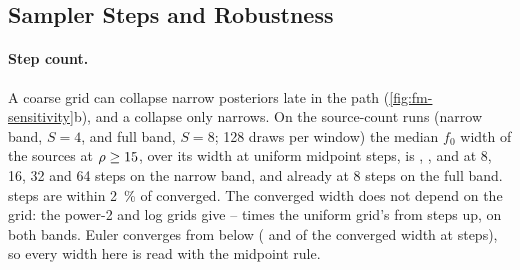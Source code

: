 \subsection{Sampler Steps and Robustness}
\label{app:evaluation-sampler}

\paragraph{Step count.}
A coarse grid can collapse narrow posteriors late in the path (\cref{fig:fm-sensitivity}b), and a collapse only narrows.
On the source-count runs (narrow band, $S=4$, and full band, $S=8$; 128 draws per window) the median $f_0$ width of the
sources at $\rho\ge15$, over its width at \ResultsSamplerNarrowMax{} uniform midpoint steps, is
\ResultsSamplerNarrowEight, \ResultsSamplerNarrowSixteen, \ResultsSamplerNarrowThirtyTwo{} and
\ResultsSamplerNarrowSixtyFour{} at 8, 16, 32 and 64 steps on the narrow band, and \ResultsSamplerFullEight{} already at 8
steps on the full band. \EvaluationOdeSteps{} steps are within \qty{2}{\percent} of converged. The converged width does not
depend on the grid: the power-2 and log grids give \ResultsSamplerGridLo--\ResultsSamplerGridHi{} times the uniform
grid's from \ResultsSamplerGridFrom{} steps up, on both bands. Euler converges from below
(\ResultsSamplerEulerNarrowThirtyTwo{} and \ResultsSamplerEulerFullThirtyTwo{} of the converged width at
\EvaluationOdeSteps{} steps), so every width here is read with the midpoint rule.

